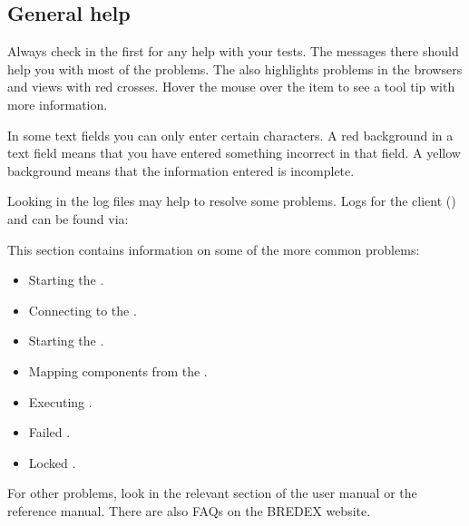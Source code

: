 % 
%
%
\label{errorHandling}

\subsection{General help}
Always check in the \gdprobview{} first for any help with your tests. The messages there should help you with most of the problems. The \ite{} also highlights problems in the browsers and views with red crosses. Hover the mouse over the item to see a tool tip with more information. 

In some text fields you can only enter certain characters. A red background in a text field means that you have entered something incorrect in that field. A yellow background means that the information entered is incomplete. 

Looking in the log files may help to resolve some problems. Logs for the client (\ite{}) and \gdagent{} can be found via:\\

This section contains information on some of the more common problems:
\begin{itemize}
\item Starting the \gdagent{} .
\item Connecting to the \gdagent{} .
\item Starting the \gdaut{} .
\item Mapping components from the \gdaut{} .
\item Executing \gdsuites{} .
\item Failed \gdsuites{} . 
\item Locked \gdcases{}   .
\end{itemize}


For other problems, look in the relevant section of the user manual or the reference manual. There are also FAQs on the BREDEX website.



